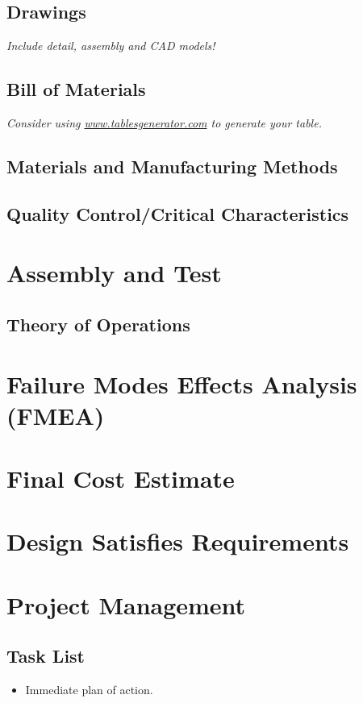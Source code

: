 \documentclass{article}
\newcommand{\cmark}{\ding{51}}%
\newcommand{\xmark}{\ding{55}}%
\newcommand{\done}{\rlap{$\square$}{\raisebox{2pt}{\large\hspace{1pt}\cmark}}%
\hspace{-2.5pt}}
\newcommand{\wontfix}{\rlap{$\square$}{\large\hspace{1pt}\xmark}}
\begin{document}
\subsection{Drawings}
\textit{Include detail, assembly and CAD models!}
\subsection{Bill of Materials}
\textit{Consider using \url{www.tablesgenerator.com} to generate your table.}
\subsection{Materials and Manufacturing Methods}
\subsection{Quality Control/Critical Characteristics}

\newpage
\section{Assembly and Test}

\newpage
\subsection{Theory of Operations}

\newpage
\section{Failure Modes Effects Analysis (FMEA)}

\newpage
\section{Final Cost Estimate}

\newpage
\section{Design Satisfies Requirements}

\newpage
\section{Project Management}
\subsection{Task List}
\begin{itemize}
  \item Immediate plan of action.
\end{itemize}
\end{document}
